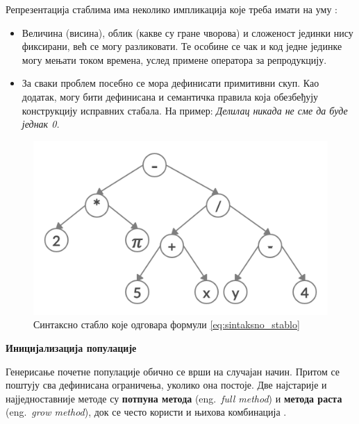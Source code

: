 \documentclass[a4paper]{article}
\begin{document}
Репрезентација стаблима има неколико импликација које треба имати на уму \cite{compIntelligence}:
\begin{itemize}
    \item Величина (висина), облик (какве су гране чворова) и сложеност јединки нису фиксирани, већ се могу разликовати. Те особине се чак и код једне јединке могу мењати током времена, услед примене оператора за репродукцију.
    \item За сваки проблем посебно се мора дефинисати примитивни скуп. Као додатак, могу бити дефинисана и семантичка правила која обезбеђују конструкцију исправних стабала. На пример: \newline
    \emph{Делилац никада не сме да буде једнак 0.}
\end{itemize}

\begin{figure}[ht!]
    \begin{center}
        \includegraphics[scale=0.22]{sintaksno_stablo.png}
    \end{center}
    \caption{Синтаксно стабло које одговара формули \eqref{eq:sintaksno_stablo}}
    \label{fig:sintaksno_stablo}
\end{figure}

\medskip
\noindent
\textbf{\large Иницијализација популације}\newline

Генерисање почетне популације обично се врши на случајан начин. Притом се поштују сва дефинисана ограничења, уколико она постоје. Две најстарије и најједноставније методе су \textbf{потпуна метода} (eng.~{\em full method}) и \textbf{метода раста} (eng.~{\em grow method}), док се често користи и њихова комбинација \cite{fieldGuidetoGP}. \newline
\end{document}
